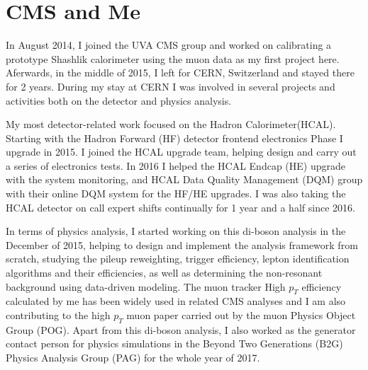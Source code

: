 \section{CMS and Me} %
In August 2014, I joined the UVA CMS group and worked on calibrating a prototype Shashlik calorimeter using the muon data as my first project here. Aferwards, in the middle of 2015, I left for CERN, Switzerland and stayed there for 2 years. During my stay at CERN I was involved in several projects and activities both on the detector and physics analysis. 

\vspace{0.3cm}
My most detector-related work focused on the Hadron Calorimeter(HCAL). Starting with the Hadron Forward (HF) detector frontend electronics Phase I upgrade in 2015. I joined the HCAL upgrade team, helping design and carry out a series of electronics tests. In 2016 I helped the HCAL Endcap (HE) upgrade with the system monitoring, and HCAL Data Quality Management (DQM) group with their online DQM system for the HF/HE upgrades. I was also taking the HCAL detector on call expert shifts continually for 1 year and a half since 2016.

\vspace{0.3cm}
In terms of physics analysis, I started working on this di-boson analysis in the December of 2015, helping to design and implement the analysis framework from scratch, studying the pileup reweighting, trigger efficiency, lepton identification algorithms and their efficiencies, as well as determining the non-resonant background using data-driven modeling. The muon tracker High $p_{T}$ efficiency calculated by me has been widely used in related CMS analyses and I am also contributing to the high $p_{T}$ muon paper carried out by the muon Physics Object Group (POG). Apart from this di-boson analysis, I also worked as the generator contact person for physics simulations in the Beyond Two Generations (B2G) Physics Analysis Group (PAG) for the whole year of 2017.
